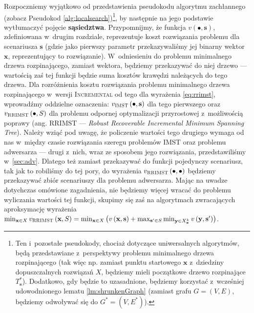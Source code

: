 Rozpoczniemy wyjątkowo od przedstawienia pseudokodu algorytmu zachłannego (zobacz Pseudokod \ref{alg:localsearch})\footnote{Ten i~pozostałe pseudokody, chociaż dotyczące uniwersalnych algorytmów, będą przedstawiane z~perspektywy problemu minimalnego drzewa rozpinającego (tak więc np. zamiast punktu startowego $\textbf{x}$ z~dziedziny dopuszczalnych rozwiązań $X$, będziemy mieli początkowe drzewo rozpinające $T^{\ast}_{\textbf{s}}$). Dodatkowo, gdy będzie to uzasadnione, będziemy korzystać z~wcześniej udowodnionego lematu \ref{lm:shrunkenGraph} (zamiast grafu $G = \left( V, E \right)$, będziemy odwoływać się do $G^{\ast} = \left( V, E^{\ast} \right)$).}, by następnie na jego podstawie wytłumaczyć pojęcie \textbf{sąsiedztwa}. Przypomnijmy, że funkcja $v \left( \bullet, \textbf{s} \right)$, zdefiniowana w~drugim rozdziale, reprezentuje koszt rozwiązania problemu dla scenariusza $\textbf{s}$ (gdzie jako pierwszy parametr przekazywaliśmy jej binarny wektor $\textbf{x}$, reprezentujący to rozwiązanie). W~odniesieniu do problemu minimalnego drzewa rozpinającego, zamiast wektora, będziemy przekazywać do niej drzewo --- wartością zaś tej funkcji będzie suma kosztów krawędzi należących do tego drzewa. Dla rozróżnienia kosztu rozwiązania problemu minimalnego drzewa rozpinającego w~wersji \textsc{Incremental} od tego dla wyrażenia \ref{eq:rrimst}, wprowadźmy oddzielne oznaczenia: $v_{\textsc{IMST}} \left( \bullet, \textbf{s} \right)$ dla tego pierwszego oraz $v_{\textsc{RRIMST}} \left( \bullet, S \right)$ dla problemu odpornej optymalizacji przyrostowej z~możliwością poprawy (ang. \textsc{RRIMST} --- \textit{Robust Recoverable Incremental Minimum Spanning Tree}). Należy wziąć pod uwagę, że policzenie wartości tego drugiego wymaga od nas w~między czasie rozwiązania szeregu problemów \textsc{IMST} oraz problemu adwersarza --- drugi z~nich, wraz ze sposobem jego rozwiązania, przedstawiliśmy w~\ref{sec:adv}. Dlatego też zamiast przekazywać do funkcji pojedynczy scenariusz, tak jak to robiliśmy do tej pory, do wyrażenia $v_{\textsc{RRIMST}} \left( \bullet, \bullet \right)$ będziemy przekazywać zbiór scenariuszy dla problemu adwersarza. Mając na uwadze dotychczas omówione zagadnienia, nie będziemy więcej wracać do problemu wyliczania wartości tej funkcji, skupimy się zaś na algorytmach zwracających aproksymację wyrażenia $\min_{\textbf{x} \in X} v_{\textsc{RRIMST}} \left( \textbf{x}, S \right) = \min_{\textbf{x} \in X} \left( v \left( \textbf{x}, \textbf{s} \right) + \max_{\textbf{s}^{\prime} \in S} \min_{\textbf{y} \in X^{k}_{\textbf{x}}} v \left( \textbf{y}, \textbf{s}^{\prime} \right) \right)$.

